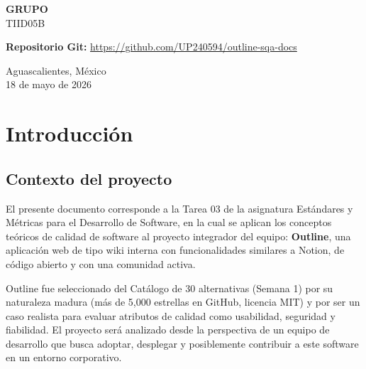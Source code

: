 \documentclass[12pt]{article}
\begin{document}
\begin{titlepage}
\begin{center}
        \vspace{0.4cm}

        {\large \textbf{GRUPO}}\\
        TIID05B

        \vfill
        {\large \textbf{Repositorio Git:} \url{https://github.com/UP240594/outline-sqa-docs}}

        {\large Aguascalientes, México\\
        18 de mayo de 2026}
    \end{center}
\end{titlepage}

\newpage
\tableofcontents
\newpage

\section{Introducción}

\subsection{Contexto del proyecto}
El presente documento corresponde a la Tarea 03 de la asignatura Estándares y Métricas para el Desarrollo de Software, en la cual se aplican los conceptos teóricos de calidad de software al proyecto integrador del equipo: \textbf{Outline}, una aplicación web de tipo wiki interna con funcionalidades similares a Notion, de código abierto y con una comunidad activa.

Outline fue seleccionado del Catálogo de 30 alternativas (Semana 1) por su naturaleza madura (más de 5,000 estrellas en GitHub, licencia MIT) y por ser un caso realista para evaluar atributos de calidad como usabilidad, seguridad y fiabilidad. El proyecto será analizado desde la perspectiva de un equipo de desarrollo que busca adoptar, desplegar y posiblemente contribuir a este software en un entorno corporativo.



\end{document}
